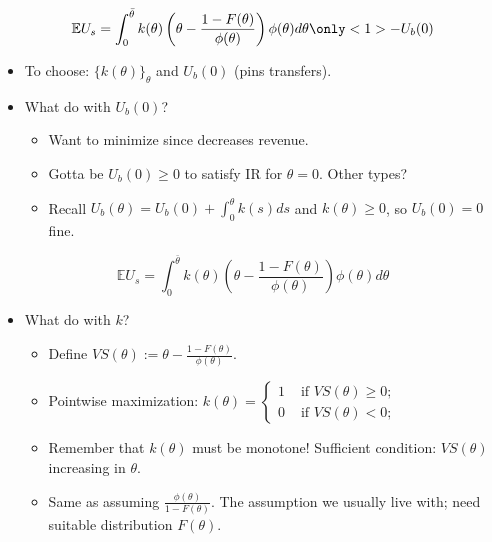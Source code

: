 \documentclass[english,handout,10pt]{beamer}		%
\def\lyxframeend{} %
\newcommand\soutred{\bgroup\markoverwith
	{\textcolor{red}{\rule[0.55ex]{2pt}{0.8pt}}}\ULon}
\begin{document}
\begin{equation*}
	\mathbb{E} U_s = \int_0^{\bar{\theta}} k(\theta) \left( \theta - \frac{1-F(\theta)}{\phi(\theta)} \right) \phi(\theta) d\theta \only<1>{- U_b(0)} %
\end{equation*}
\begin{itemize}
	\item To choose: $\{k(\theta)\}_\theta$ and $U_b(0)$ (pins transfers).
	\pause
	\item What do with $U_b(0)$?
	\begin{itemize}
		\item Want to minimize since decreases revenue.
		\item Gotta be $U_b(0) \geq 0$ to satisfy IR for $\theta = 0$. Other types?
		\pause
		\item Recall $U_b(\theta) = U_b(0) + \int_0^\theta k(s) ds$ and $k(\theta) \geq 0$, so $U_b(0) = 0$ fine.
	\end{itemize}
\end{itemize}
\lyxframeend


\begin{equation*}
\mathbb{E} U_s = \int_0^{\bar{\theta}} k(\theta) \left( \theta - \frac{1-F(\theta)}{\phi(\theta)} \right) \phi(\theta) d\theta
\end{equation*}
\begin{itemize}
	\item What do with $k$?
	\begin{itemize}[<+->]
		\item Define  $VS(\theta) := \theta - \frac{1-F(\theta)}{\phi(\theta)}$.
		\item Pointwise maximization: 
			$k(\theta) = \begin{cases}
				1 & \text{ if } VS(\theta) \geq 0;
				\\ 0 & \text{ if } VS(\theta) < 0;
			\end{cases}$
		\item Remember that $k(\theta)$ must be monotone! Sufficient condition: $VS(\theta)$ increasing in $\theta$.
		\item Same as assuming  $\frac{\phi(\theta)}{1-F(\theta)}$. The assumption we usually live with; need suitable distribution $F(\theta)$.
	\end{itemize}
\end{itemize}
\lyxframeend
\end{document}
